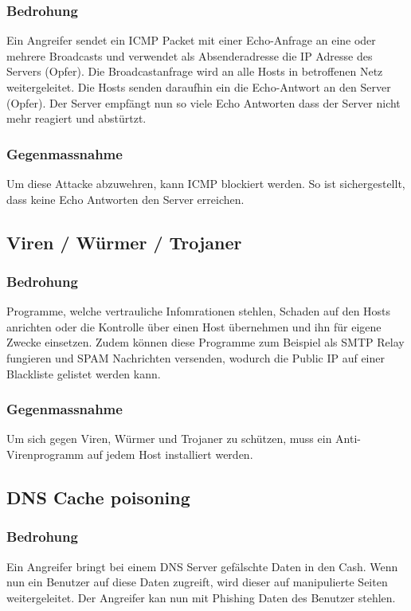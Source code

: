 \documentclass[11pt,a4paper,parskip=half]{scrartcl}
\begin{document}
\subsubsection{Bedrohung}
Ein Angreifer sendet ein ICMP Packet mit einer Echo-Anfrage an eine oder mehrere Broadcasts und verwendet als Absenderadresse die IP Adresse des Servers (Opfer). Die Broadcastanfrage wird an alle Hosts in betroffenen Netz weitergeleitet. Die Hosts senden daraufhin ein die Echo-Antwort an den Server (Opfer). Der Server empfängt nun so viele Echo Antworten dass der Server nicht mehr reagiert und abstürtzt.
\subsubsection{Gegenmassnahme}
Um diese Attacke abzuwehren, kann ICMP blockiert werden. So ist sichergestellt, dass keine Echo Antworten den Server erreichen.

\subsection{Viren / Würmer / Trojaner}
\subsubsection{Bedrohung}
Programme, welche vertrauliche Infomrationen stehlen, Schaden auf den Hosts anrichten oder die Kontrolle über einen Host übernehmen und ihn für eigene Zwecke einsetzen. Zudem können diese Programme zum Beispiel als SMTP Relay fungieren und SPAM Nachrichten versenden, wodurch die Public IP auf einer Blackliste gelistet werden kann.
\subsubsection{Gegenmassnahme}
Um sich gegen Viren, Würmer und Trojaner zu schützen, muss ein Anti-Virenprogramm auf jedem Host installiert werden.

\subsection{DNS Cache poisoning}
\subsubsection{Bedrohung}
Ein Angreifer bringt bei einem DNS Server gefälschte Daten in den Cash. Wenn nun ein Benutzer auf diese Daten zugreift, wird dieser auf manipulierte Seiten weitergeleitet. Der Angreifer kan nun mit Phishing Daten des Benutzer stehlen.
\end{document}
